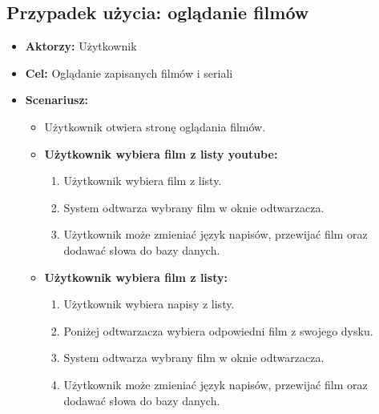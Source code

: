 \subsection{Przypadek użycia: oglądanie filmów}
\begin{itemize}
    \item \textbf{Aktorzy:} Użytkownik
    \item \textbf{Cel:} Oglądanie zapisanych filmów i seriali
    \item \textbf{Scenariusz:}
          \begin{itemize}
              \item Użytkownik otwiera stronę oglądania filmów.
              \item \textbf{Użytkownik wybiera film z listy youtube:}
                    \begin{enumerate}
                        \item Użytkownik wybiera film z listy.
                        \item System odtwarza wybrany film w oknie odtwarzacza.
                        \item Użytkownik może zmieniać język napisów, przewijać film oraz dodawać słowa do bazy danych.
                    \end{enumerate}
              \item \textbf{Użytkownik wybiera film z listy:}
                    \begin{enumerate}
                        \item Użytkownik wybiera napisy z listy.
                        \item Poniżej odtwarzacza wybiera odpowiedni film z swojego dysku.
                        \item System odtwarza wybrany film w oknie odtwarzacza.
                        \item Użytkownik może zmieniać język napisów, przewijać film oraz dodawać słowa do bazy danych.
                    \end{enumerate}
          \end{itemize}
\end{itemize}

